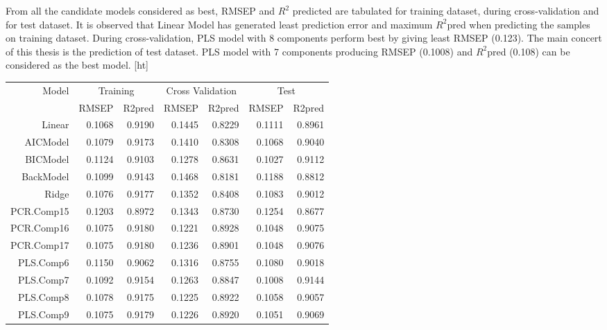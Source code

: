 \documentclass[12pt, lot, lof]{thesis}\usepackage[]{graphicx}\usepackage[]{color}
\makeatletter
\renewenvironment{table}%
  {\renewcommand{\familydefault}{\sfdefault}\selectfont
  \@float{table}}
  {\end@float}
\makeatother
\begin{document}
From all the candidate models considered as best, RMSEP and $R^2$ predicted are tabulated for training dataset, during cross-validation and for test dataset. It is observed that Linear Model has generated least prediction error and maximum $R^2$pred when predicting the samples on training dataset. During cross-validation, PLS model with 8 components perform best by giving least RMSEP (0.123). The main concert of this thesis is the prediction of test dataset. PLS model with 7 components producing RMSEP (0.1008) and $R^2$pred (0.108) can be considered as the best model.
\begin{table}[ht]
\centering
\caption{Validation result containing RMSEP and R2pred for training set, cross-validation set and test set} 
\label{tbl:valdSumry}
\begin{tabular}{rrrrrrr}
  \hline Model & 
                 \multicolumn{2}{c}{Training} & 
                 \multicolumn{2}{c}{Cross Validation} & 
                 \multicolumn{2}{c}{Test} \\ 
                 \cline{2-7} & RMSEP & R2pred & RMSEP & R2pred & RMSEP & R2pred \\ \hline
  \hline
Linear & 0.1068 & 0.9190 & 0.1445 & 0.8229 & 0.1111 & 0.8961 \\ 
  AICModel & 0.1079 & 0.9173 & 0.1410 & 0.8308 & 0.1068 & 0.9040 \\ 
  BICModel & 0.1124 & 0.9103 & 0.1278 & 0.8631 & 0.1027 & 0.9112 \\ 
  BackModel & 0.1099 & 0.9143 & 0.1468 & 0.8181 & 0.1188 & 0.8812 \\ 
  Ridge & 0.1076 & 0.9177 & 0.1352 & 0.8408 & 0.1083 & 0.9012 \\ 
  PCR.Comp15 & 0.1203 & 0.8972 & 0.1343 & 0.8730 & 0.1254 & 0.8677 \\ 
  PCR.Comp16 & 0.1075 & 0.9180 & 0.1221 & 0.8928 & 0.1048 & 0.9075 \\ 
  PCR.Comp17 & 0.1075 & 0.9180 & 0.1236 & 0.8901 & 0.1048 & 0.9076 \\ 
  PLS.Comp6 & 0.1150 & 0.9062 & 0.1316 & 0.8755 & 0.1080 & 0.9018 \\ 
  PLS.Comp7 & 0.1092 & 0.9154 & 0.1263 & 0.8847 & 0.1008 & 0.9144 \\ 
  PLS.Comp8 & 0.1078 & 0.9175 & 0.1225 & 0.8922 & 0.1058 & 0.9057 \\ 
  PLS.Comp9 & 0.1075 & 0.9179 & 0.1226 & 0.8920 & 0.1051 & 0.9069 \\ 
   \hline
\end{tabular}
\end{table}
\end{document}
